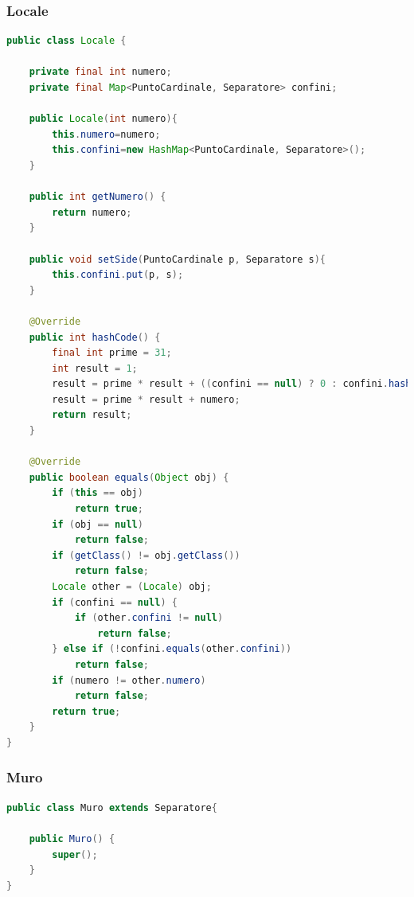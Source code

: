 \documentclass{article}
\begin{document}
\subsubsection{Locale}
\begin{lstlisting}[language=Java]
public class Locale {
	
	private final int numero;
	private final Map<PuntoCardinale, Separatore> confini;
	
	public Locale(int numero){
		this.numero=numero;
		this.confini=new HashMap<PuntoCardinale, Separatore>();
	}

	public int getNumero() {
		return numero;
	}
	
	public void setSide(PuntoCardinale p, Separatore s){
		this.confini.put(p, s);
	}

	@Override
	public int hashCode() {
		final int prime = 31;
		int result = 1;
		result = prime * result + ((confini == null) ? 0 : confini.hashCode());
		result = prime * result + numero;
		return result;
	}

	@Override
	public boolean equals(Object obj) {
		if (this == obj)
			return true;
		if (obj == null)
			return false;
		if (getClass() != obj.getClass())
			return false;
		Locale other = (Locale) obj;
		if (confini == null) {
			if (other.confini != null)
				return false;
		} else if (!confini.equals(other.confini))
			return false;
		if (numero != other.numero)
			return false;
		return true;
	}
}
\end{lstlisting}

\subsubsection{Muro}
\begin{lstlisting}[language=Java]
public class Muro extends Separatore{

	public Muro() {
		super();
	}
}
\end{lstlisting}
\end{document}

